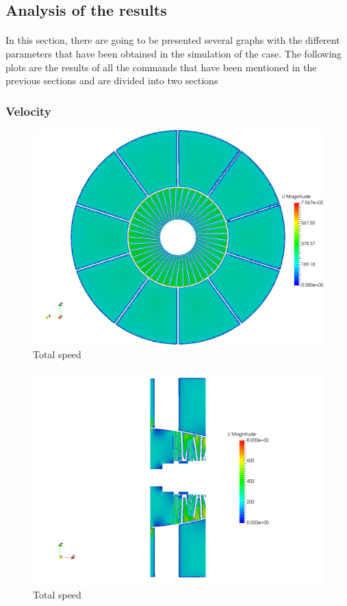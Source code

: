 \subsection{Analysis of the results}

\paragraph{}In this section, there are going to be presented several graphs with the different parameters that have been obtained in the simulation of the case. The following plots are the results of all the commands that have been mentioned in the previous sections and are divided into two sections


\subsubsection{Velocity}

\begin{figure}[h!]
\centering
\includegraphics[scale=0.25]{./img/screenshoots/U1.png}
\caption{Total speed}
\label{u1}
\end{figure}

\begin{figure}[h!]
\centering
\includegraphics[scale=0.3]{./img/screenshoots/U2.png}
\caption{Total speed}
\label{u2}
\end{figure}


